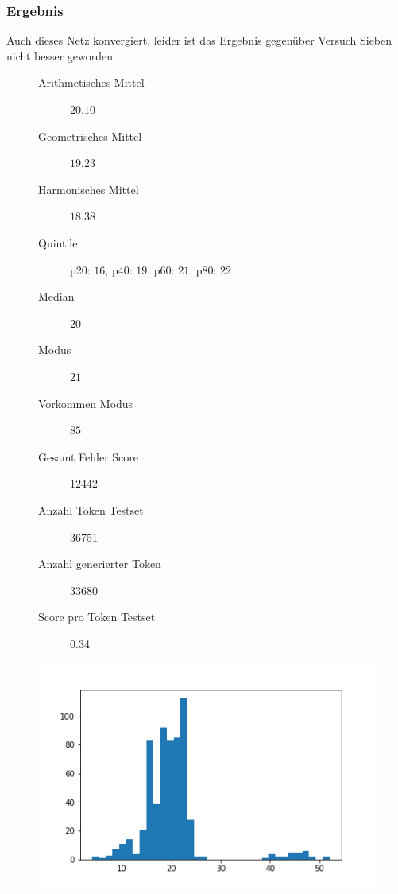\documentclass[pdftex,a4paper,halfparskip, article]{scrartcl}
\begin{document}
\subsubsection*{Ergebnis}

Auch dieses Netz konvergiert, leider ist das Ergebnis gegenüber Versuch Sieben nicht besser geworden.

\begin{figure}
\centering
\begin{minipage}{.5\textwidth}
  \centering
  \begin{description}
	\item[Arithmetisches Mittel] $20.10$	
	\item[Geometrisches Mittel] $19.23$
	\item[Harmonisches Mittel] $18.38$
	\item[Quintile] p20: $16$, p40: $19$, p60: $21$, p80: $22$
	\item[Median] $20$
	\item[Modus] $21$
	\item[Vorkommen Modus] $85$
	\item[Gesamt Fehler Score] 12442
	\item[Anzahl Token Testset] 36751 
	\item[Anzahl generierter Token] 33680
	\item[Score pro Token Testset]  0.34
\end{description}
  \label{fig:lage_bin14}
\end{minipage}%
\begin{minipage}{.5\textwidth}
  \centering
  \includegraphics[width=1\linewidth]{predictions_bin14_histogramm}
  \label{fig:hist_bin14}
\end{minipage}
\end{figure}
\end{document}
